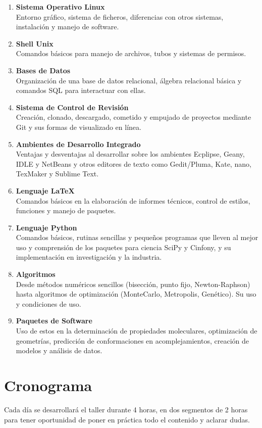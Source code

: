 \documentclass[10pt,letterpaper]{article}
\begin{document}
\begin{enumerate}
\item \textbf{Sistema Operativo Linux}\\ Entorno gr\'afico, sistema de ficheros, diferencias con otros sistemas, instalaci\'on y manejo de software.
\item \textbf{Shell Unix}\\ Comandos b\'asicos para manejo de archivos, tubos y sistemas de permisos.
\item \textbf{Bases de Datos}\\ Organizaci\'on de una base de datos relacional, \'algebra relacional b\'asica y comandos SQL para interactuar con ellas.
\item \textbf{Sistema de Control de Revisi\'on}\\ Creaci\'on, clonado, descargado, cometido y empujado de proyectos mediante Git y sus formas de visualizado en l\'inea.
\item \textbf{Ambientes de Desarrollo Integrado}\\ Ventajas y desventajas al desarrollar sobre los ambientes Ecplipse, Geany, IDLE y NetBeans y otros editores de texto como Gedit/Pluma, Kate, nano, TexMaker y Sublime Text.
\item \textbf{Lenguaje \LaTeX\ }\\ Comandos b\'asicos en la elaboraci\'on de informes t\'ecnicos, control de estilos, funciones y manejo de paquetes.
\item \textbf{Lenguaje Python}\\ Comandos b\'asicos, rutinas sencillas y peque\~nos programas que lleven al mejor uso y comprensi\'on de los paquetes para ciencia SciPy y Cinfony, y su implementaci\'on en investigaci\'on y la industria.
\item \textbf{Algoritmos}\\ Desde m\'etodos num\'ericos sencillos (bisecci\'on, punto fijo, Newton-Raphson) hasta algoritmos de optimizaci\'on (MonteCarlo, Metropolis, Gen\'etico). Su uso y condiciones de uso.
\item \textbf{Paquetes de Software}\\ Uso de estos en la determinaci\'on de propiedades moleculares, optimizaci\'on de geometr\'ias, predicci\'on de conformaciones en acomplejamientos, creaci\'on de modelos y an\'alisis de datos.
\end{enumerate}

\section{Cronograma}
Cada d\'ia se desarrollar\'a el taller durante 4 horas, en dos segmentos de 2 horas para tener oportunidad de poner en pr\'actica todo el contenido y aclarar dudas.
\end{document}
